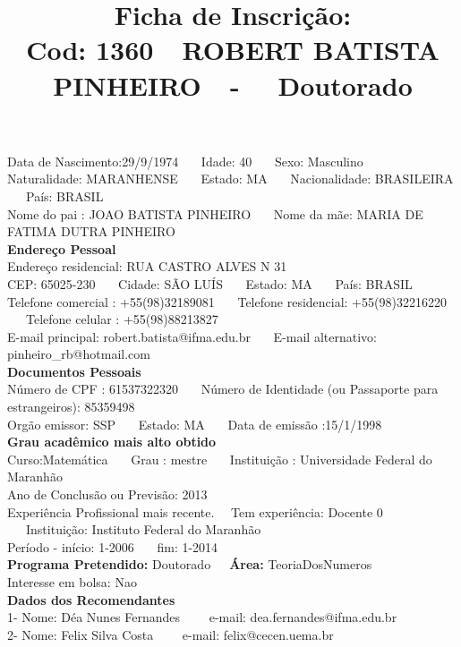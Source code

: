 \documentclass[11pt]{article}
\title{\vspace*{-4cm} Ficha de Inscrição: \\Cod: 1360\ \ ROBERT BATISTA PINHEIRO\ \ - \ \ Doutorado 
 }
\date{}
\begin{document}
\maketitle
\vspace*{-1.5cm}
\noindent Data de Nascimento:29/9/1974
\ \ \ Idade: 40   \ \ \ Sexo: Masculino
\\
Naturalidade: MARANHENSE  
\ \ \  Estado: MA
\ \ \  Nacionalidade: BRASILEIRA
\ \ \ País: BRASIL
\\        
Nome do pai : JOAO BATISTA PINHEIRO
\ \ \ Nome da mãe: MARIA DE FATIMA DUTRA PINHEIRO          
\\[0.2cm]                     
\textbf{Endereço Pessoal} 
\\ 
\noindent Endereço residencial: RUA CASTRO ALVES N 31
\\
        CEP: 65025-230 
\ \ \ Cidade: SÃO LUÍS 
\ \ \ Estado: MA 
\ \ \ País: BRASIL
\\		
		Telefone comercial : +55(98)32189081
\ \ \ Telefone residencial: +55(98)32216220
\ \ \ Telefone celular : +55(98)88213827
\\
E-mail principal: robert.batista@ifma.edu.br
\ \ \ E-mail alternativo: pinheiro\_rb@hotmail.com 
\\[0.2cm] 
\textbf{Documentos Pessoais}
\\
\noindent Número de CPF : 61537322320
\ \ \ Número de Identidade (ou Passaporte para estrangeiros): 85359498
\\
Orgão emissor: SSP 
\ \ \ Estado: MA
\ \ \ Data de emissão :15/1/1998
\\[0.3cm]
\textbf{Grau acadêmico mais alto obtido}
\\	
Curso:Matemática
\ \ \ Grau : mestre
\ \ \ Instituição : Universidade Federal do Maranhão
\\			
Ano de Conclusão ou Previsão: 2013
\\ 
Experiência Profissional mais recente. \ \  
Tem experiência: Docente 0  
\ \ \ Instituição: Instituto Federal do Maranhão
\\  
Período - início: 1-2006
\ \ \ fim: 1-2014
\\[0.2cm] 
\textbf{Programa Pretendido:} Doutorado\ \ \ \textbf{Área:} TeoriaDosNumeros\\
Interesse em bolsa: Nao
\\[0.3cm]		
\textbf{Dados dos Recomendantes} 
\\
1- Nome: Déa Nunes Fernandes
\ \ \ \  e-mail: dea.fernandes@ifma.edu.br 
\\
2- Nome: Felix Silva Costa
\ \ \ \ e-mail: felix@cecen.uema.br
\end{document}
